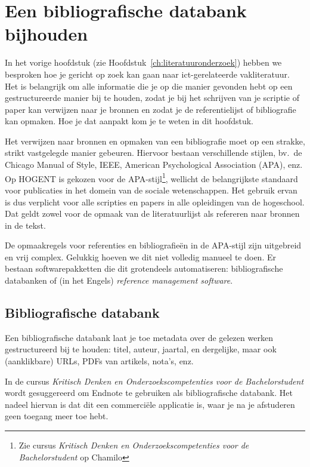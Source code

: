 \chapter{Een bibliografische databank bijhouden}%
\label{ch:bibliografie}

In het vorige hoofdstuk (zie Hoofdstuk~\ref{ch:literatuuronderzoek}) hebben we besproken hoe je gericht op zoek kan gaan naar ict-gerelateerde vakliteratuur. Het is belangrijk om alle informatie die je op die manier gevonden hebt op een gestructureerde manier bij te houden, zodat je bij het schrijven van je scriptie of paper kan verwijzen naar je bronnen en zodat je de referentielijst of bibliografie kan opmaken. Hoe je dat aanpakt kom je te weten in dit hoofdstuk.

Het verwijzen naar bronnen en opmaken van een bibliografie moet op een strakke, strikt vastgelegde manier gebeuren. Hiervoor bestaan verschillende stijlen, bv.\ de Chicago Manual of Style, IEEE, American Psychological Association (APA), enz. Op HOGENT is gekozen voor de APA-stijl\footnote{Zie cursus \emph{Kritisch Denken en Onderzoekscompetenties voor de Bachelorstudent} op Chamilo}, wellicht de belangrijkste standaard voor publicaties in het domein van de sociale wetenschappen. Het gebruik ervan is dus verplicht voor alle scripties en papers in alle opleidingen van de hogeschool. Dat geldt zowel voor de opmaak van de literatuurlijst als refereren naar bronnen in de tekst.

De opmaakregels voor referenties en bibliografieën in de APA-stijl zijn uitgebreid en vrij complex. Gelukkig hoeven we dit niet volledig manueel te doen. Er bestaan softwarepakketten die dit grotendeels automatiseren: bibliografische databanken of (in het Engels) \emph{reference management software}.

\section{Bibliografische databank}%
\label{sec:bibliografische-databank}

Een bibliografische databank laat je toe metadata over de gelezen werken gestructureerd bij te houden: titel, auteur, jaartal, en dergelijke, maar ook (aanklikbare) URLs, PDFs van artikels, nota's, enz.

In de cursus \emph{Kritisch Denken en Onderzoekscompetenties voor de Bachelorstudent} wordt gesuggereerd om Endnote te gebruiken als bibliografische databank. Het nadeel hiervan is dat dit een commerciële applicatie is, waar je na je afstuderen geen toegang meer toe hebt.


